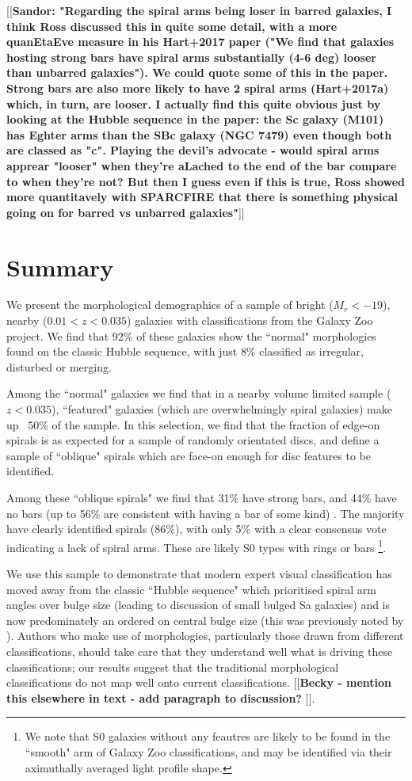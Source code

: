 \documentclass[usenatbib]{mn2e}
\newcommand{\comment}[2][todo]{{\color{#1}[[{\bf #2}]]}}
\begin{document}
\comment{Sandor: "Regarding the spiral arms being loser in barred galaxies, I think Ross discussed this in quite some detail, with a more quanEtaEve measure in his Hart+2017 paper ("We find that galaxies hosting strong bars have spiral arms substantially (4-6 deg) looser than unbarred galaxies"). We could quote some of this in the paper. Strong bars are also more likely to have 2 spiral arms (Hart+2017a) which, in turn, are looser. I actually find this quite obvious just by looking at the Hubble sequence in the paper: the Sc galaxy (M101) has Eghter arms than the SBc galaxy (NGC 7479) even though both are classed as "c". Playing the devil's advocate - would spiral arms apprear "looser" when they're aLached to the end of the bar compare to when they're not? But then I guess even if this is true, Ross showed more quantitavely with SPARCFIRE that there is something physical going on for barred vs unbarred galaxies"}


\section{Summary}

We present the morphological demographics of a sample of bright ($M_r <-19$), nearby ($0.01<z<0.035$) galaxies with classifications from the Galaxy Zoo project. We find that {92\%} of these galaxies show the ``normal" morphologies found on the classic Hubble sequence, with just {8\%} classified as irregular, disturbed or merging. 

Among the ``normal" galaxies we find that in a nearby volume limited sample ($z<0.035$), ``featured" galaxies (which are overwhelmingly spiral galaxies) make up ~50\% of the sample. In this selection, we find that the fraction of edge-on spirals is as expected for a sample of randomly orientated discs, and define a sample of ``oblique" spirals which are face-on enough for disc features to be identified. 

 Among these ``oblique spirals" we find that {31\%} have strong bars, and {44\%} have no bars (up to 56\% are consistent with having a bar of some kind) . The majority have clearly identified spirals ({86\%}), with only {5\%} with a clear consensus vote indicating a lack of spiral arms. These are likely S0 types with rings or bars \footnote{We note that S0 galaxies without any feautres are likely to be found in the ``smooth" arm of Galaxy Zoo classifications, and may be identified via their aximuthally averaged light profile shape.}. 
 
 We use this sample to demonstrate that modern expert visual classification has moved away from the classic ``Hubble sequence" which prioritised spiral arm angles over bulge size (leading to discussion of small bulged Sa galaxies) and is now predominately an ordered on central bulge size (this was previously noted by \citealt{Willett2013}). Authors who make use of morphologies, particularly those drawn from different classifications, should take care that they understand well what is driving these classifications; our results suggest that the traditional morphological classifications do not map well onto current classifications. \comment{Becky - mention this elsewhere in text - add paragraph to discussion? }. 
\end{document}
